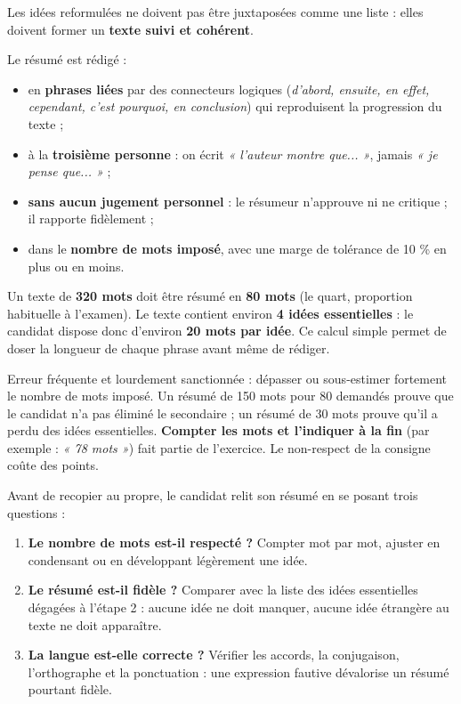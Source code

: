 \documentclass[11pt]{article}
\newcounter{popsec}
\newcounter{popsub}
\newcommand{\courssub}[1]{%
  \stepcounter{popsub}%
  \par\vspace{9pt}\noindent{\popxbold\fontsize{11.5}{13}\selectfont\color{popink}{\color{poporange}\thepopsec.\thepopsub}\hspace{6pt}#1}\par\nopagebreak\vspace{4pt}
}
\begin{document}
Les idées reformulées ne doivent pas être juxtaposées comme une liste : elles doivent former un \textbf{texte suivi et cohérent}.

\begin{propriete}
Le résumé est rédigé :
\begin{itemize}
\item en \textbf{phrases liées} par des connecteurs logiques (\emph{d'abord, ensuite, en effet, cependant, c'est pourquoi, en conclusion}) qui reproduisent la progression du texte ;
\item à la \textbf{troisième personne} : on écrit \emph{« l'auteur montre que... »}, jamais \emph{« je pense que... »} ;
\item \textbf{sans aucun jugement personnel} : le résumeur n'approuve ni ne critique ; il rapporte fidèlement ;
\item dans le \textbf{nombre de mots imposé}, avec une marge de tolérance de 10 \% en plus ou en moins.
\end{itemize}
\end{propriete}

\begin{exemplebox}
Un texte de \textbf{320 mots} doit être résumé en \textbf{80 mots} (le quart, proportion habituelle à l'examen). Le texte contient environ \textbf{4 idées essentielles} : le candidat dispose donc d'environ \textbf{20 mots par idée}. Ce calcul simple permet de doser la longueur de chaque phrase avant même de rédiger.
\end{exemplebox}

\begin{attention}
Erreur fréquente et lourdement sanctionnée : dépasser ou sous-estimer fortement le nombre de mots imposé. Un résumé de 150 mots pour 80 demandés prouve que le candidat n'a pas éliminé le secondaire ; un résumé de 30 mots prouve qu'il a perdu des idées essentielles. \textbf{Compter les mots et l'indiquer à la fin} (par exemple : \emph{« 78 mots »}) fait partie de l'exercice. Le non-respect de la consigne coûte des points.
\end{attention}

\courssub{Étape 6 : la vérification finale}

Avant de recopier au propre, le candidat relit son résumé en se posant trois questions :

\begin{enumerate}
\item \textbf{Le nombre de mots est-il respecté ?} Compter mot par mot, ajuster en condensant ou en développant légèrement une idée.
\item \textbf{Le résumé est-il fidèle ?} Comparer avec la liste des idées essentielles dégagées à l'étape 2 : aucune idée ne doit manquer, aucune idée étrangère au texte ne doit apparaître.
\item \textbf{La langue est-elle correcte ?} Vérifier les accords, la conjugaison, l'orthographe et la ponctuation : une expression fautive dévalorise un résumé pourtant fidèle.
\end{enumerate}
\end{document}
